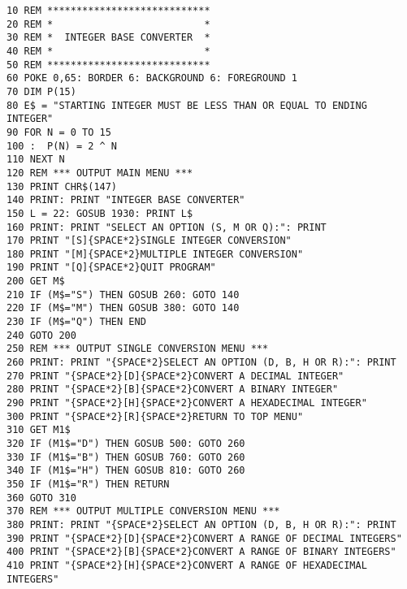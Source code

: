 \begin{tcolorbox}[colback=black,coltext=white]
\verbatimfont{\codefont}
\begin{verbatim}
10 REM ****************************
20 REM *                          *
30 REM *  INTEGER BASE CONVERTER  *
40 REM *                          *
50 REM ****************************
60 POKE 0,65: BORDER 6: BACKGROUND 6: FOREGROUND 1
70 DIM P(15)
80 E$ = "STARTING INTEGER MUST BE LESS THAN OR EQUAL TO ENDING INTEGER"
90 FOR N = 0 TO 15
100 :  P(N) = 2 ^ N
110 NEXT N
120 REM *** OUTPUT MAIN MENU ***
130 PRINT CHR$(147)
140 PRINT: PRINT "INTEGER BASE CONVERTER"
150 L = 22: GOSUB 1930: PRINT L$
160 PRINT: PRINT "SELECT AN OPTION (S, M OR Q):": PRINT
170 PRINT "[S]{SPACE*2}SINGLE INTEGER CONVERSION"
180 PRINT "[M]{SPACE*2}MULTIPLE INTEGER CONVERSION"
190 PRINT "[Q]{SPACE*2}QUIT PROGRAM"
200 GET M$
210 IF (M$="S") THEN GOSUB 260: GOTO 140
220 IF (M$="M") THEN GOSUB 380: GOTO 140
230 IF (M$="Q") THEN END
240 GOTO 200
250 REM *** OUTPUT SINGLE CONVERSION MENU ***
260 PRINT: PRINT "{SPACE*2}SELECT AN OPTION (D, B, H OR R):": PRINT
270 PRINT "{SPACE*2}[D]{SPACE*2}CONVERT A DECIMAL INTEGER"
280 PRINT "{SPACE*2}[B]{SPACE*2}CONVERT A BINARY INTEGER"
290 PRINT "{SPACE*2}[H]{SPACE*2}CONVERT A HEXADECIMAL INTEGER"
300 PRINT "{SPACE*2}[R]{SPACE*2}RETURN TO TOP MENU"
310 GET M1$
320 IF (M1$="D") THEN GOSUB 500: GOTO 260
330 IF (M1$="B") THEN GOSUB 760: GOTO 260
340 IF (M1$="H") THEN GOSUB 810: GOTO 260
350 IF (M1$="R") THEN RETURN
360 GOTO 310
370 REM *** OUTPUT MULTIPLE CONVERSION MENU ***
380 PRINT: PRINT "{SPACE*2}SELECT AN OPTION (D, B, H OR R):": PRINT
390 PRINT "{SPACE*2}[D]{SPACE*2}CONVERT A RANGE OF DECIMAL INTEGERS"
400 PRINT "{SPACE*2}[B]{SPACE*2}CONVERT A RANGE OF BINARY INTEGERS"
410 PRINT "{SPACE*2}[H]{SPACE*2}CONVERT A RANGE OF HEXADECIMAL INTEGERS"
\end{verbatim}
\end{tcolorbox}
